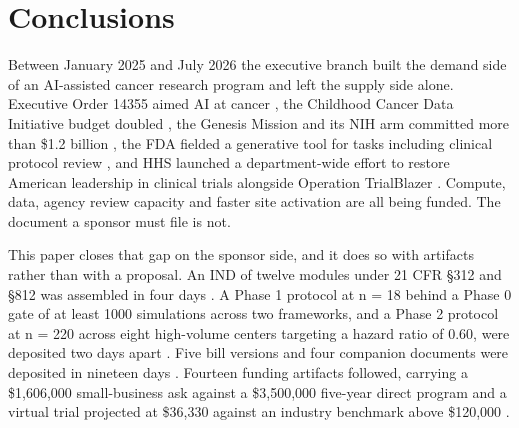 \section{Conclusions}
\label{sec:conclusions}

Between January 2025 and July 2026 the executive branch built the demand side of
an AI-assisted cancer research program and left the supply side alone. Executive
Order 14355 aimed AI at cancer \cite{eo14355}, the Childhood Cancer Data
Initiative budget doubled \cite{ccdidoubling_nih}, the Genesis Mission and its
NIH arm committed more than \$1.2 billion \cite{eo14363, biogenesis_nih}, the
FDA fielded a generative tool for tasks including clinical protocol review
\cite{crs_ai_healthcare}, and HHS launched a department-wide effort to restore
American leadership in clinical trials alongside Operation TrialBlazer
\cite{trialblazer}. Compute, data, agency review capacity and faster site
activation are all being funded. The document a sponsor must file is not.


This paper closes that gap on the sponsor side, and it does so with artifacts
rather than with a proposal. An IND of twelve modules under 21 CFR \S 312 and
\S 812 was assembled in four days \cite{phase1ind}. A Phase 1 protocol at n = 18
behind a Phase 0 gate of at least 1000 simulations across two frameworks, and a
Phase 2 protocol at n = 220 across eight high-volume centers targeting a hazard
ratio of 0.60, were deposited two days apart
\cite{onpremwhippl, phase2proto}. Five bill versions and four companion
documents were deposited in nineteen days \cite{hr9510billv5, clintrust}.
Fourteen funding artifacts followed, carrying a \$1,606,000 small-business ask
against a \$3,500,000 five-year direct program and a virtual trial projected at
\$36,330 against an industry benchmark above \$120,000
\cite{capplan2026, tenapps2026, rfarm27001v2}.


